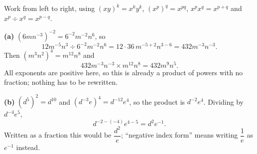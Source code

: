 Work from left to right, using $(xy)^k=x^ky^k$, $\left(x^p\right)^q=x^{pq}$, $x^px^q=x^{p+q}$ and $x^p\div x^q=x^{p-q}$.

\textbf{(a)} $\left(6mn^{-3}\right)^{-2}=6^{-2}m^{-2}n^{6}$, so
\[
12m^{-5}n^{3}\div6^{-2}m^{-2}n^{6}=12\cdot36\,m^{-5+2}n^{3-6}=432m^{-3}n^{-3}.
\]
Then $\left(m^3n^2\right)^4=m^{12}n^{8}$ and
\[
432m^{-3}n^{-3}\times m^{12}n^{8}=\boxed{432m^{9}n^{5}} .
\]
All exponents are positive here, so this is already a product of powers with no fraction; nothing has to be rewritten.

\textbf{(b)} $\left(d^5\right)^2=d^{10}$ and $\left(d^{-3}e\right)^4=d^{-12}e^{4}$, so the product is $d^{-2}e^{4}$. Dividing by $d^{-4}e^{5}$,
\[
d^{-2-(-4)}e^{4-5}=\boxed{d^{2}e^{-1}} .
\]
Written as a fraction this would be $\dfrac{d^2}{e}$; ``negative index form'' means writing $\dfrac{1}{e}$ as $e^{-1}$ instead.
